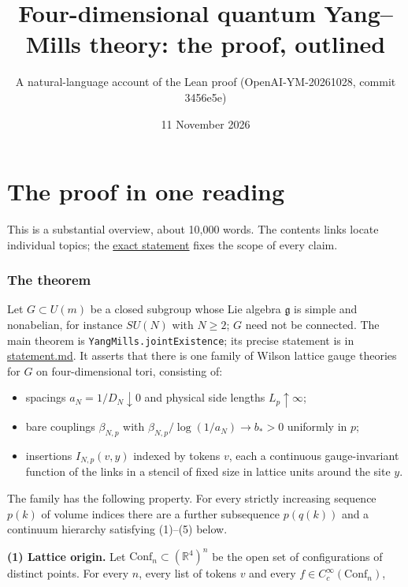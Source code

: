\documentclass[
  letterpaper,
  11pt]{article}
\title{Four-dimensional quantum Yang--Mills theory: the proof, outlined}
\subtitle{A natural-language account of the Lean proof
(OpenAI-YM-20261028, commit 3456e5e)}
\author{}
\date{11 November 2026}
\providecommand{\tightlist}{%
  \setlength{\itemsep}{0pt}\setlength{\parskip}{0pt}}
\begin{document}
\maketitle

{
\setcounter{tocdepth}{2}
\tableofcontents
}
\section{The proof in one reading}\label{the-proof-in-one-reading}

This is a substantial overview, about 10,000 words. The contents links
locate individual topics; the
\href{https://github.com/scottnarmstrong/yang-mills-informalization/blob/main/statement.md}{exact
statement} fixes the scope of every claim.

\subsubsection{The theorem}\label{the-theorem}

Let \(G\subset U(m)\) be a closed subgroup whose Lie algebra
\(\mathfrak g\) is simple and nonabelian, for instance \(SU(N)\) with
\(N\ge2\); \(G\) need not be connected. The main theorem is
\texttt{YangMills.jointExistence}; its precise statement is in
\href{https://github.com/scottnarmstrong/yang-mills-informalization/blob/main/statement.md}{statement.md}.
It asserts that there is one family of Wilson lattice gauge theories for
\(G\) on four-dimensional tori, consisting of:

\begin{itemize}
\tightlist
\item
  spacings \(a_N=1/D_N\downarrow0\) and physical side lengths
  \(L_p\uparrow\infty\);
\item
  bare couplings \(\beta_{N,p}\) with
  \(\beta_{N,p}/\log(1/a_N)\to b_\ast>0\) uniformly in \(p\);
\item
  insertions \(I_{N,p}(v,y)\) indexed by tokens \(v\), each a continuous
  gauge-invariant function of the links in a stencil of fixed size in
  lattice units around the site \(y\).
\end{itemize}

The family has the following property. For every strictly increasing
sequence \(p(k)\) of volume indices there are a further subsequence
\(p(q(k))\) and a continuum hierarchy satisfying (1)--(5) below.

\textbf{(1) Lattice origin.} Let
\(\mathrm{Conf}_n\subset(\mathbb R^4)^n\) be the open set of
configurations of distinct points. For every \(n\), every list of tokens
\(v\) and every \(f\in C_c^\infty(\mathrm{Conf}_n)\),
\end{document}
